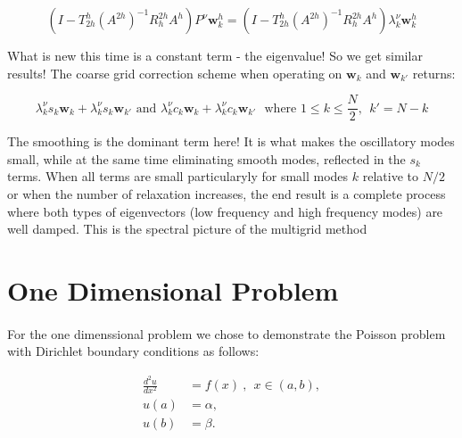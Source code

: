 \documentclass[pdftex,12pt,a4paper]{article}
\begin{document}
$$
\left(I - T_{2h}^h (A^{2h})^{-1} R_h^{2h} A^h \right) P^{\nu} \mathbf{w}_k^h = \left(I - T_{2h}^h (A^{2h})^{-1} R_h^{2h} A^h \right) \lambda^{\nu}_k  \mathbf{w}_k^h
$$

What is new this time is a constant term - the eigenvalue! So we get similar results!  The coarse grid correction scheme when operating on $\mathbf{w}_k$ and $\mathbf{w}_{k'}$ returns:

$$
\lambda_k^{\nu} s_k \mathbf{w}_k + \lambda_k^{\nu} s_k \mathbf{w}_{k'} \text{ and } \lambda_k^{\nu}c_k \mathbf{w}_k
+ \lambda_k^{\nu} c_k \mathbf{w}_{k'} ~~~ \text{where } 1 \leq k \leq \frac N 2, ~~ k' = N-k
$$

The smoothing is the dominant term here! It is what makes the oscillatory modes small, while at the same time eliminating smooth modes, reflected in the $s_k$ terms. When all terms are small particularyly for small modes $k$ relative to $N/2$ or when the number of relaxation increases, the end result is a complete process where both types of eigenvectors (low frequency and high frequency modes) are well damped. This is the spectral picture of the multigrid method








\section{One Dimensional Problem}
    
    \paragraph*{} For the one dimenssional problem we chose to demonstrate the Poisson problem with Dirichlet boundary conditions as follows:
    
    \begin{equation}
    \begin{aligned}
        \frac{d^2u}{dx^2} &= f(x) ~ , ~~ x \in (a, b), \\
        u(a) &= \alpha, \\
        u(b) &= \beta.
    \end{aligned}
    \end{equation}
    
\end{document}
